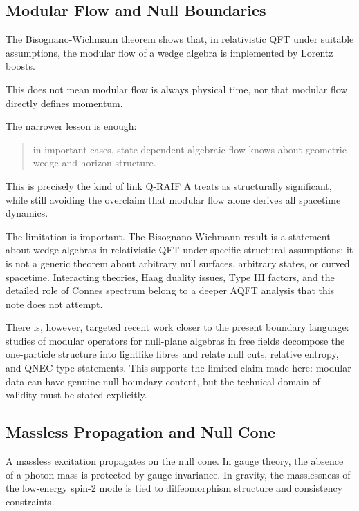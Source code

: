 \documentclass[12pt,a4paper]{article}
\theoremstyle{definition}
\theoremstyle{remark}
\begin{document}
\subsection{Modular Flow and Null
Boundaries}\label{modular-flow-and-null-boundaries}

The Bisognano-Wichmann theorem shows that, in relativistic QFT under
suitable assumptions, the modular flow of a wedge algebra is implemented
by Lorentz boosts.

This does not mean modular flow is always physical time, nor that
modular flow directly defines momentum.

The narrower lesson is enough:

\begin{quote}
in important cases, state-dependent algebraic flow knows about geometric
wedge and horizon structure.
\end{quote}

This is precisely the kind of link Q-RAIF A treats as structurally
significant, while still avoiding the overclaim that modular flow alone
derives all spacetime dynamics.

The limitation is important. The Bisognano-Wichmann result is a
statement about wedge algebras in relativistic QFT under specific
structural assumptions; it is not a generic theorem about arbitrary null
surfaces, arbitrary states, or curved spacetime. Interacting theories,
Haag duality issues, Type III factors, and the detailed role of Connes
spectrum belong to a deeper AQFT analysis that this note does not
attempt.

There is, however, targeted recent work closer to the present boundary
language: studies of modular operators for null-plane algebras in free
fields decompose the one-particle structure into lightlike fibres and
relate null cuts, relative entropy, and QNEC-type statements. This
supports the limited claim made here: modular data can have genuine
null-boundary content, but the technical domain of validity must be
stated explicitly.

\subsection{Massless Propagation and Null
Cone}\label{massless-propagation-and-null-cone}

A massless excitation propagates on the null cone. In gauge theory, the
absence of a photon mass is protected by gauge invariance. In gravity,
the masslessness of the low-energy spin-2 mode is tied to diffeomorphism
structure and consistency constraints.
\end{document}
